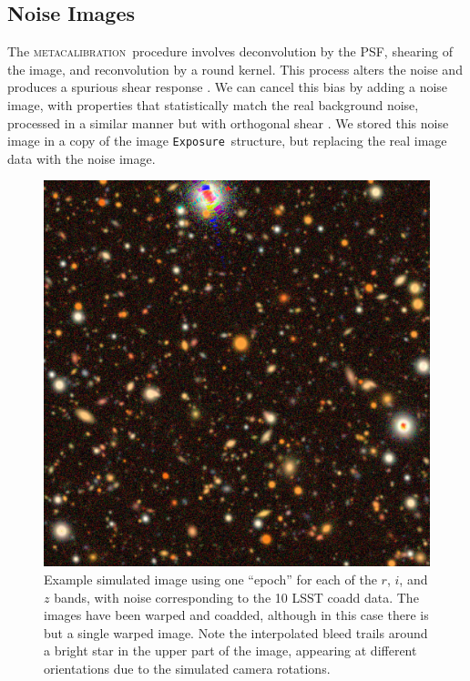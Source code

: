 \documentclass[twocolumn,twocolappendix,astrosym]{openjournal}
\newcommand{\calexp}{\texttt{Exposure}}
\newcommand{\mcal}{\textsc{metacalibration}}
\begin{document}
\subsection{Noise Images} \label{sec:sim:noiseimages}

The \mcal\ procedure involves deconvolution by the PSF, shearing of the image,
and reconvolution by a round kernel.  This process alters the noise and
produces a spurious shear response \citep{SheldonMcal2017}.  We can cancel this
bias by adding a noise image, with properties that statistically match the real
background noise, processed in a similar manner but with orthogonal shear
\citep{SheldonMcal2017,mdet20}.  We stored this noise image in a copy of the image
\calexp\ structure, but replacing the real image data with the noise image.

\begin{figure}
    \includegraphics[width=\columnwidth]{example-image.jpg}
    \caption{
        Example simulated image using one ``epoch'' for each of the $r$, $i$,
        and $z$ bands, with noise corresponding to the 10 LSST coadd data.
        The images have been warped and coadded, although in this case there
        is but a single warped image.
        Note the interpolated bleed trails around a bright star in the upper
        part of the image, appearing at different orientations due to the
        simulated camera rotations.
    } \label{fig:colorimage}
\end{figure}
\end{document}
